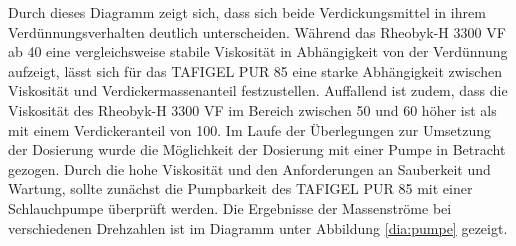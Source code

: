 \FloatBarrier 
Durch dieses Diagramm zeigt sich, dass sich beide Verdickungsmittel in ihrem Verdünnungsverhalten deutlich unterscheiden. Während das Rheobyk-H 3300 VF ab \SI{40}{\mpercent} eine vergleichsweise stabile Viskosität in Abhängigkeit von der Verdünnung aufzeigt, lässt sich für das TAFIGEL PUR 85 eine starke Abhängigkeit zwischen Viskosität und Verdickermassenanteil festzustellen. Auffallend ist zudem, dass die Viskosität des Rheobyk-H 3300 VF im Bereich zwischen 50 und \SI{60}{\mpercent} höher ist als mit einem Verdickeranteil von \SI{100}{\mpercent}.
%
%
%
Im Laufe der Überlegungen zur Umsetzung der Dosierung wurde die Möglichkeit der Dosierung mit einer Pumpe in Betracht gezogen. Durch die hohe Viskosität und den Anforderungen an Sauberkeit und Wartung, sollte zunächst die Pumpbarkeit des TAFIGEL PUR 85 mit einer Schlauchpumpe überprüft werden. Die Ergebnisse der Massenströme bei verschiedenen Drehzahlen ist im Diagramm unter Abbildung \ref{dia:pumpe} gezeigt.

